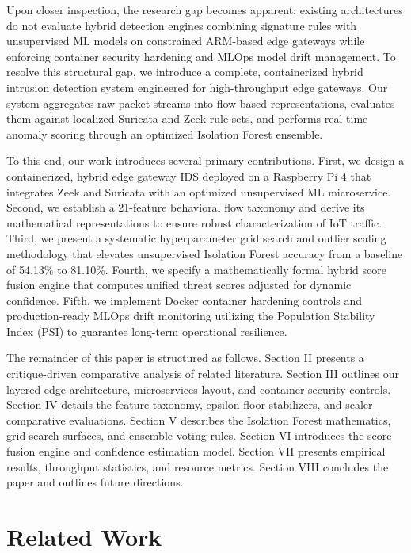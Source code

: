 \documentclass[journal]{IEEEtran}
\begin{document}
Upon closer inspection, the research gap becomes apparent: existing architectures do not evaluate hybrid detection engines combining signature rules with unsupervised ML models on constrained ARM-based edge gateways while enforcing container security hardening and MLOps model drift management. To resolve this structural gap, we introduce a complete, containerized hybrid intrusion detection system engineered for high-throughput edge gateways. Our system aggregates raw packet streams into flow-based representations, evaluates them against localized Suricata and Zeek rule sets, and performs real-time anomaly scoring through an optimized Isolation Forest ensemble. 

To this end, our work introduces several primary contributions. First, we design a containerized, hybrid edge gateway IDS deployed on a Raspberry Pi 4 that integrates Zeek and Suricata with an optimized unsupervised ML microservice. Second, we establish a 21-feature behavioral flow taxonomy and derive its mathematical representations to ensure robust characterization of IoT traffic. Third, we present a systematic hyperparameter grid search and outlier scaling methodology that elevates unsupervised Isolation Forest accuracy from a baseline of 54.13\% to 81.10\%. Fourth, we specify a mathematically formal hybrid score fusion engine that computes unified threat scores adjusted for dynamic confidence. Fifth, we implement Docker container hardening controls and production-ready MLOps drift monitoring utilizing the Population Stability Index (PSI) to guarantee long-term operational resilience.

The remainder of this paper is structured as follows. Section II presents a critique-driven comparative analysis of related literature. Section III outlines our layered edge architecture, microservices layout, and container security controls. Section IV details the feature taxonomy, epsilon-floor stabilizers, and scaler comparative evaluations. Section V describes the Isolation Forest mathematics, grid search surfaces, and ensemble voting rules. Section VI introduces the score fusion engine and confidence estimation model. Section VII presents empirical results, throughput statistics, and resource metrics. Section VIII concludes the paper and outlines future directions.

\section{Related Work}
\end{document}
